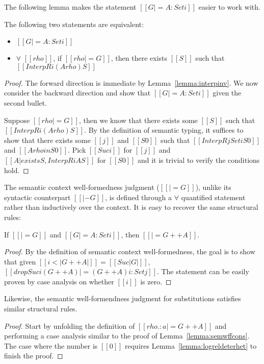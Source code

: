 \documentclass[acmsmall,screen=true,
\ifpublic review=false\else,review=true\fi
  ,anonymous=\ifanonymous true\else false\fi]{acmart}
\newcommand{\dotv}[2]{\href{#1}{\texttt{#1}}{\texttt{:#2}}}
\newcommand{\scw}[1]{}
\begin{document}
The following lemma makes the statement $[[G |= A : Set i]]$ easier to
work with.
\begin{lemma}[Set Inv\footnote{\dotv{soundness.v}{SemWt\_Univ}}\scw{spell out the whole word}]
  \label{lemma:setinv}
  The following two statements are equivalent:
  \begin{itemize}
  \item $[[G |= A : Set i]]$
  \item $\forall$ $[[rho]]$, if $[[rho |= G]]$, then there exists
    $[[S]]$ such that $[[InterpR i (A {rho}) S]]$
  \end{itemize}
\end{lemma}
\begin{proof}
  The forward direction is immediate by
  Lemma~\ref{lemma:interpinv}. We now consider the backward direction
  and show that $[[G |= A : Set i]]$ given the second bullet.

  Suppose $[[rho |= G]]$, then we know that there exists some $[[S]]$
  such that $[[InterpR i (A {rho}) S]]$. By the definition of semantic
  typing, it suffices to show that there exists some $[[j]]$ and
  $[[S0]]$ such that  $[[InterpR j Set i S0]]$ and $[[A {rho} in
  S0]]$.
  Pick $[[Suc i]]$ for $[[j]]$ and $[[ { A | exists S , InterpR i A S }
  ]]$ for $[[S0]]$ and it is trivial to verify the conditions hold.
\end{proof}

The semantic context well-formedness judgment ($[[|= G]]$), unlike its syntactic
counterpart $[[|- G]]$, is defined through a $\forall$ quantified statement rather
than inductively over the context. \scw{why is that the case?} It is easy to recover the same
structural rules:
\begin{lemma}
  \label{lemma:semwffcons}
  If $[[|= G]]$ and $[[G |= A : Set i]]$, then $[[|= G ++ A]]$.
\end{lemma}
\scw{point out that this lemma is the semantic analogue to Ctx-Cons. What about
Ctx-empty?}
\begin{proof}
  By the definition of semantic context well-formedness, the goal is
  to show that given $[[i < | G ++ A |]] = [[Suc |G|]]$, $[[drop Suc i
  (G ++ A) |= (G ++ A) i : Set j]]$. The statement can be easily
  proven by case analysis on whether $[[i]]$ is zero.
\end{proof}

Likewise, the semantic well-formendness judgment for substitutions
satisfies similar structural rules.
\begin{proof}
  Start by unfolding the definition of $[[rho .: a |= G ++ A]]$ and
  performing a case analysis similar to the proof of
  Lemma~\ref{lemma:semwffcons}.  The case where the number is $[[0]]$
  requires Lemma~\ref{lemma:logreldeterhet} to finish the proof.
\end{proof}
\end{document}
